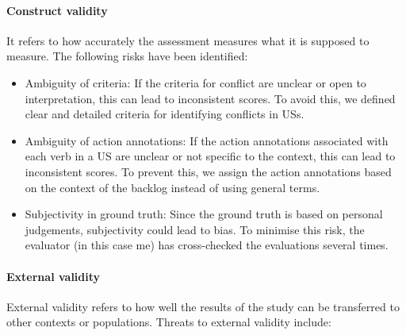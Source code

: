 \paragraph{Construct validity}It refers to how accurately the assessment measures what it is supposed to measure. The following risks have been identified:
\begin{itemize}
	\item Ambiguity of criteria: If the criteria for conflict are unclear or open to interpretation, this can lead to inconsistent scores. To avoid this, we defined clear and detailed criteria for identifying conflicts in USs.
	
	\item Ambiguity of action annotations: If the action annotations associated with each verb in a US are unclear or not specific to the context, this can lead to inconsistent scores. To prevent this, we assign the action annotations based on the context of the backlog instead of using general terms.
	
	\item Subjectivity in ground truth: Since the ground truth is based on personal judgements, subjectivity could lead to bias. To minimise this risk, the evaluator (in this case me) has cross-checked the evaluations several times.
\end{itemize}
\paragraph{External validity}External validity refers to how well the results of the study can be transferred to other contexts or populations. Threats to external validity include:

